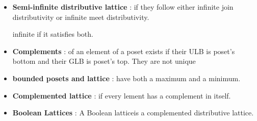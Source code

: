 \begin{itemize}
	\item{\textbf{Semi-infinite distributive lattice} : if they follow either infinite join distributivity or infinite meet distributivity.

	infinite if it satisfies both.
	}

	\item{\textbf{Complements} : of an element of a poset exists if their ULB is poset's bottom and their GLB is poset's top. They are not unique
	}

	\item{\textbf{bounded posets and lattice} : have both a maximum and a minimum.
	}

	\item{\textbf{Complemented lattice} : if every lement has a complement in itself.
	}

	\item{\textbf{Boolean Lattices} : A Boolean latticeis a complemented distributive lattice.
	}

\end{itemize}